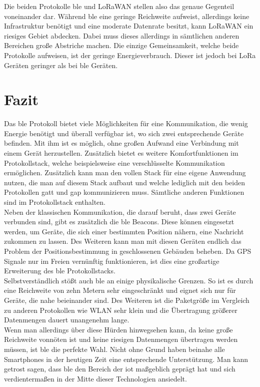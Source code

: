 \noindent Die beiden Protokolle \ac{ble} und LoRaWAN stellen also das genaue Gegenteil voneinander dar. Während \ac{ble} eine geringe Reichweite aufweist, allerdings keine Infrastruktur benötigt und eine moderate Datenrate besitzt, kann LoRaWAN ein riesiges Gebiet abdecken. Dabei muss dieses allerdings in sämtlichen anderen Bereichen große Abstriche machen. Die einzige Gemeinsamkeit, welche beide Protokolle aufweisen, ist der geringe Energieverbrauch. Dieser ist jedoch bei LoRa Geräten geringer als bei \ac{ble} Geräten.\\ 

\section{Fazit}
\label{s:fazit}

Das \ac{ble} Protokoll bietet viele Möglichkeiten für eine Kommunikation, die wenig Energie benötigt und überall verfügbar ist, wo sich zwei entsprechende Geräte befinden. Mit ihm ist es möglich, ohne großen Aufwand eine Verbindung mit einem Gerät herzustellen. Zusätzlich bietet es weitere Komfortfunktionen im Protokollstack, welche beispielsweise eine verschlüsselte Kommunikation ermöglichen. Zusätzlich kann man den vollen Stack für eine eigene Anwendung nutzen, die man auf diesem Stack aufbaut und welche lediglich mit den beiden Protokollen \ac{gatt} und \ac{gap} kommunizieren muss. Sämtliche anderen Funktionen sind im Protokollstack enthalten.\\

\noindent Neben der klassischen Kommunikation, die darauf beruht, dass zwei Geräte verbunden sind, gibt es zusätzlich die \ac{ble} Beacons. Diese können eingesetzt werden, um Geräte, die sich einer bestimmten Position nähern, eine Nachricht zukommen zu lassen. Des Weiteren kann man mit diesen Geräten endlich das Problem der Positionsbestimmung in geschlossenen Gebäuden beheben. Da GPS Signale nur im Freien vernünftig funktionieren, ist dies eine großartige Erweiterung des \ac{ble} Protokollstacks.\\

\noindent Selbstverständlich stößt auch \ac{ble} an einige physikalische Grenzen. So ist es durch eine Reichweite von zehn Metern sehr eingeschränkt und eignet sich nur für Geräte, die nahe beieinander sind. Des Weiteren ist die Paketgröße im Vergleich zu anderen Protokollen wie WLAN sehr klein und die Übertragung größerer Datenmengen dauert unangenehm lange.\\

\noindent Wenn man allerdings über diese Hürden hinwegsehen kann, da keine große Reichweite vonnöten ist und keine riesigen Datenmengen übertragen werden müssen, ist \ac{ble} die perfekte Wahl. Nicht ohne Grund haben beinahe alle Smartphones in der heutigen Zeit eine entsprechende Unterstützung. Man kann getrost sagen, dass \ac{ble} den Bereich der \ac{iot} maßgeblich geprägt hat und sich verdientermaßen in der Mitte dieser Technologien ansiedelt.\\     
